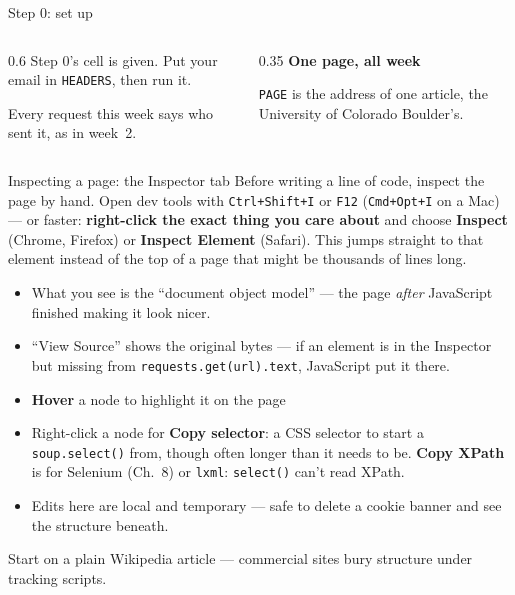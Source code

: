 \documentclass[9pt,aspectratio=169]{beamer}
\begin{document}
\begin{frame}{Step 0: set up}
    \begin{columns}[T]
        \begin{column}{0.6\textwidth}
            Step 0's cell is given. Put your email in \texttt{HEADERS}, then run it.

            \medskip
            Every request this week says who sent it, as in week~2.
        \end{column}
        \begin{column}{0.35\textwidth}
            \textbf{One page, all week}\\[2pt]
            {\footnotesize \texttt{PAGE} is the address of one article, the University of Colorado Boulder's.\par}
        \end{column}
    \end{columns}
\end{frame}

\begin{frame}{Inspecting a page: the Inspector tab}
    Before writing a line of code, inspect the page by hand. Open dev tools with \texttt{Ctrl+Shift+I} or \texttt{F12} (\texttt{Cmd+Opt+I} on a Mac) --- or faster: \textbf{right-click the exact thing you care about} and choose \textbf{Inspect} (Chrome, Firefox) or \textbf{Inspect Element} (Safari). This jumps straight to that element instead of the top of a page that might be thousands of lines long.

    \medskip

    \begin{itemize}\small 
        \item What you see is the ``document object model'' --- the page \emph{after} JavaScript finished making it look nicer.
        \item ``View Source'' shows the original bytes --- if an element is in the Inspector but missing from \texttt{requests.get(url).text}, JavaScript put it there.
        \item \textbf{Hover} a node to highlight it on the page
        \item Right-click a node for \textbf{Copy selector}: a CSS selector to start a \texttt{soup.select()} from, though often longer than it needs to be. \textbf{Copy XPath} is for Selenium (Ch.~8) or \texttt{lxml}: \texttt{select()} can't read XPath.
        \item Edits here are local and temporary --- safe to delete a cookie banner and see the structure beneath.
    \end{itemize}

    \medskip
    Start on a plain Wikipedia article --- commercial sites bury structure under tracking scripts.
\end{frame}
\end{document}

